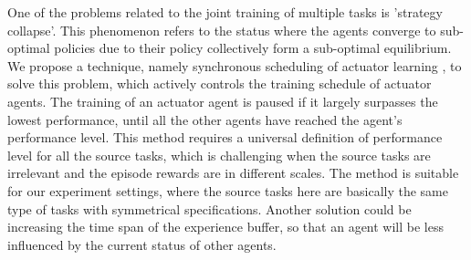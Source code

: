 One of the problems related to the joint training of multiple tasks is 'strategy collapse'. This phenomenon refers to the status where the agents converge to sub-optimal policies due to their policy collectively form a sub-optimal equilibrium. We propose a technique, namely synchronous scheduling of actuator learning , to solve this problem, which actively controls the training schedule of actuator agents. The training of an actuator agent is paused if it largely surpasses the lowest performance, until all the other agents have reached the agent's performance level. This method requires a universal definition of performance level for all the source tasks, which is challenging when the source tasks are irrelevant and the episode rewards are in different scales. The method is suitable for our experiment settings, where the source tasks here are basically the same type of tasks with symmetrical specifications. Another solution could be increasing the time span of the experience buffer, so that an agent will be less influenced by the current status of other agents.

